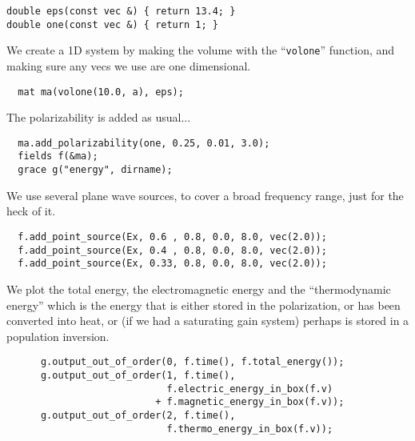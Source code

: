 \begin{verbatim}
double eps(const vec &) { return 13.4; }
double one(const vec &) { return 1; }
\end{verbatim}
\begin{comment}
int main(int argc, char **argv) {
  deal_with_ctrl_c();
  const double ttot = 600.0;
\end{comment}
We create a 1D system by making the volume with the ``\verb!volone!''
function, and making sure any vecs we use are one dimensional.
\begin{verbatim}
  mat ma(volone(10.0, a), eps);
\end{verbatim}
\begin{comment}
  const char *dirname = make_output_directory(argv[0]);
  ma.set_output_directory(dirname);
\end{comment}
The polarizability is added as usual...
\begin{verbatim}
  ma.add_polarizability(one, 0.25, 0.01, 3.0);
  fields f(&ma);
  grace g("energy", dirname);
\end{verbatim}
We use several plane wave sources, to cover a broad frequency range, just
for the heck of it.
\begin{verbatim}
  f.add_point_source(Ex, 0.6 , 0.8, 0.0, 8.0, vec(2.0));
  f.add_point_source(Ex, 0.4 , 0.8, 0.0, 8.0, vec(2.0));
  f.add_point_source(Ex, 0.33, 0.8, 0.0, 8.0, vec(2.0));
\end{verbatim}
\begin{comment}
  double next_printtime = 10;
  while (f.time() < ttot && !interrupt) {
    if (f.time() >= next_printtime) {
      next_printtime += 10;
      printf("Working on time %
      printf("energy is %
      printf("magnetic energy is %
      printf("electric energy is %
      printf("thermo energy is %
\end{comment}
We plot the total energy, the electromagnetic energy and the
``thermodynamic energy'' which is the energy that is either stored in the
polarization, or has been converted into heat, or (if we had a saturating
gain system) perhaps is stored in a population inversion.
\begin{verbatim}
      g.output_out_of_order(0, f.time(), f.total_energy());
      g.output_out_of_order(1, f.time(),
                            f.electric_energy_in_box(f.v)
                          + f.magnetic_energy_in_box(f.v));
      g.output_out_of_order(2, f.time(),
                            f.thermo_energy_in_box(f.v));
\end{verbatim}
\begin{comment}
    }
    f.step();
  }
}
\end{comment}


